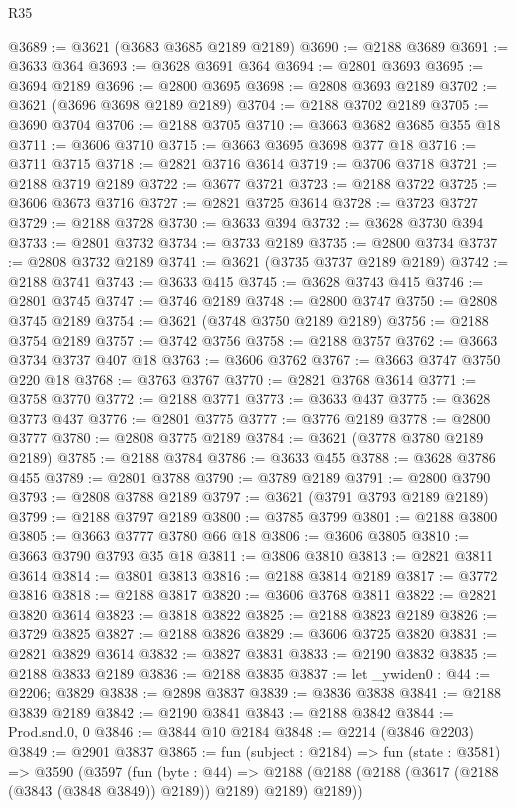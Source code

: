 \begin{lexlean}{R35}
\begin{coremodule}
@3689 := @3621 (@3683 @3685 @2189 @2189)
@3690 := @2188 @3689
@3691 := @3633 @364
@3693 := @3628 @3691 @364
@3694 := @2801 @3693
@3695 := @3694 @2189
@3696 := @2800 @3695
@3698 := @2808 @3693 @2189
@3702 := @3621 (@3696 @3698 @2189 @2189)
@3704 := @2188 @3702 @2189
@3705 := @3690 @3704
@3706 := @2188 @3705
@3710 := @3663 @3682 @3685 @355 @18
@3711 := @3606 @3710
@3715 := @3663 @3695 @3698 @377 @18
@3716 := @3711 @3715
@3718 := @2821 @3716 @3614
@3719 := @3706 @3718
@3721 := @2188 @3719 @2189
@3722 := @3677 @3721
@3723 := @2188 @3722
@3725 := @3606 @3673 @3716
@3727 := @2821 @3725 @3614
@3728 := @3723 @3727
@3729 := @2188 @3728
@3730 := @3633 @394
@3732 := @3628 @3730 @394
@3733 := @2801 @3732
@3734 := @3733 @2189
@3735 := @2800 @3734
@3737 := @2808 @3732 @2189
@3741 := @3621 (@3735 @3737 @2189 @2189)
@3742 := @2188 @3741
@3743 := @3633 @415
@3745 := @3628 @3743 @415
@3746 := @2801 @3745
@3747 := @3746 @2189
@3748 := @2800 @3747
@3750 := @2808 @3745 @2189
@3754 := @3621 (@3748 @3750 @2189 @2189)
@3756 := @2188 @3754 @2189
@3757 := @3742 @3756
@3758 := @2188 @3757
@3762 := @3663 @3734 @3737 @407 @18
@3763 := @3606 @3762
@3767 := @3663 @3747 @3750 @220 @18
@3768 := @3763 @3767
@3770 := @2821 @3768 @3614
@3771 := @3758 @3770
@3772 := @2188 @3771
@3773 := @3633 @437
@3775 := @3628 @3773 @437
@3776 := @2801 @3775
@3777 := @3776 @2189
@3778 := @2800 @3777
@3780 := @2808 @3775 @2189
@3784 := @3621 (@3778 @3780 @2189 @2189)
@3785 := @2188 @3784
@3786 := @3633 @455
@3788 := @3628 @3786 @455
@3789 := @2801 @3788
@3790 := @3789 @2189
@3791 := @2800 @3790
@3793 := @2808 @3788 @2189
@3797 := @3621 (@3791 @3793 @2189 @2189)
@3799 := @2188 @3797 @2189
@3800 := @3785 @3799
@3801 := @2188 @3800
@3805 := @3663 @3777 @3780 @66 @18
@3806 := @3606 @3805
@3810 := @3663 @3790 @3793 @35 @18
@3811 := @3806 @3810
@3813 := @2821 @3811 @3614
@3814 := @3801 @3813
@3816 := @2188 @3814 @2189
@3817 := @3772 @3816
@3818 := @2188 @3817
@3820 := @3606 @3768 @3811
@3822 := @2821 @3820 @3614
@3823 := @3818 @3822
@3825 := @2188 @3823 @2189
@3826 := @3729 @3825
@3827 := @2188 @3826
@3829 := @3606 @3725 @3820
@3831 := @2821 @3829 @3614
@3832 := @3827 @3831
@3833 := @2190 @3832
@3835 := @2188 @3833 @2189
@3836 := @2188 @3835
@3837 := let _ywiden0 : @44 := @2206; @3829
@3838 := @2898 @3837
@3839 := @3836 @3838
@3841 := @2188 @3839 @2189
@3842 := @2190 @3841
@3843 := @2188 @3842
@3844 := Prod.snd.{0, 0}
@3846 := @3844 @10 @2184
@3848 := @2214 (@3846 @2203)
@3849 := @2901 @3837
@3865 := fun (subject : @2184) =>
  fun (state : @3581) =>
  @3590
    (@3597
      (fun (byte : @44) =>
      @2188 (@2188 (@2188 (@3617 (@2188 (@3843 (@3848 @3849)) @2189)) @2189) @2189) @2189))

\end{coremodule}
\end{lexlean}
